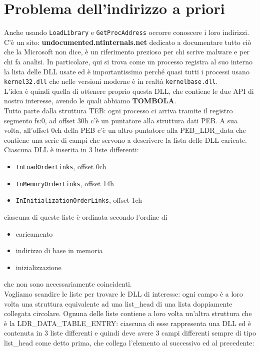 \documentclass[12pt, oneside]{extbook}
\begin{document}
\section{Problema dell'indirizzo a priori}
Anche usando \texttt{LoadLibrary} e \texttt{GetProcAddress} occorre conoscere i loro indirizzi.\\C'è un sito: \textbf{undocumented.ntinternals.net} dedicato a documentare tutto ciò che la Microsoft non dice, è un riferimento prezioso per chi scrive malware e per chi fa analisi. In particolare, qui si trova come un processo registra al suo interno la lista delle DLL usate ed è importantissimo perché quasi tutti i processi usano \texttt{kernel32.dll} che nelle versioni moderne è in realtà \texttt{kernelbase.dll}.\\L'idea è quindi quella di ottenere proprio questa DLL, che contiene le due API di nostro interesse, avendo le quali abbiamo \textsf{\textbf{TOMBOLA}}.\\Tutto parte dalla struttura TEB: ogni processo ci arriva tramite il registro segmento fs:0, ad offset 30h c'è un puntatore alla struttura dati PEB. A sua volta, all'offset 0ch della PEB c'è un altro puntatore alla PEB\_LDR\_data che contiene una serie di campi che servono a descrivere la lista delle DLL caricate.\\Ciascuna DLL è inserita in 3 liste differenti:
\begin{itemize}
	\item \texttt{InLoadOrderLinks}, offset 0ch
	\item \texttt{InMemoryOrderLinks}, offset 14h
	\item \texttt{InInitializationOrderLinks}, offset 1ch
\end{itemize}
ciascuna di queste liste è ordinata secondo l'ordine di
\begin{itemize}
	\item caricamento
	\item indirizzo di base in memoria
	\item inizializzazione
\end{itemize}
che non sono necessariamente coincidenti.\\Vogliamo scandire le liste per trovare le DLL di interesse: ogni campo è a loro volta una struttura equivalente ad una list\_head di una lista doppiamente collegata circolare. Ognuna delle liste contiene a loro volta un'altra struttura che è la LDR\_DATA\_TABLE\_ENTRY: ciascuna di esse rappresenta una DLL ed è contenuta in 3 liste differenti e quindi deve avere 3 campi differenti sempre di tipo list\_head come detto prima, che collega l'elemento al successivo ed al precedente:
\end{document}
